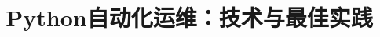 \documentclass[a4paper,12pt]{ctexbook}
\begin{document}
\title{Python自动化运维：技术与最佳实践}
\maketitle

\end{document}
